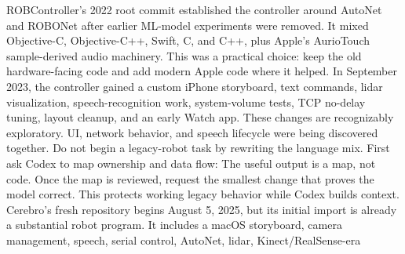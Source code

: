 {}
\markdownRendererSectionEnd \markdownRendererSectionBegin
{}\markdownRendererInterblockSeparator
{}ROBController's 2022 root commit established the controller around AutoNet and\markdownRendererSoftLineBreak
{}ROBONet after earlier ML-model experiments were removed. It mixed Objective-C,\markdownRendererSoftLineBreak
{}Objective-C++, Swift, C, and C++, plus Apple's AurioTouch sample-derived audio\markdownRendererSoftLineBreak
{}machinery. This was a practical choice: keep the old hardware-facing code and\markdownRendererSoftLineBreak
{}add modern Apple code where it helped.\markdownRendererParagraphSeparator
{}In September 2023, the controller gained a custom iPhone storyboard, text\markdownRendererSoftLineBreak
{}commands, lidar visualization, speech-recognition work, system-volume tests,\markdownRendererSoftLineBreak
{}TCP no-delay tuning, layout cleanup, and an early Watch app. These changes are\markdownRendererSoftLineBreak
{}recognizably exploratory. UI, network behavior, and speech lifecycle were\markdownRendererSoftLineBreak
{}being discovered together.\markdownRendererInterblockSeparator
{}\markdownRendererSectionBegin
{}\markdownRendererInterblockSeparator
{}Do not begin a legacy-robot task by rewriting the language mix. First ask Codex\markdownRendererSoftLineBreak
{}to map ownership and data flow:\markdownRendererInterblockSeparator
{}\markdownRendererInterblockSeparator
{}The useful output is a map, not code. Once the map is reviewed, request the\markdownRendererSoftLineBreak
{}smallest change that proves the model correct. This protects working legacy\markdownRendererSoftLineBreak
{}behavior while Codex builds context.\markdownRendererInterblockSeparator
{}\markdownRendererThematicBreak{}\markdownRendererInterblockSeparator
{}
\markdownRendererSectionEnd 
\markdownRendererSectionEnd \markdownRendererSectionBegin
{}\markdownRendererInterblockSeparator
{}Cerebro's fresh repository begins August 5, 2025, but its initial import is\markdownRendererSoftLineBreak
{}already a substantial robot program. It includes a macOS storyboard, camera\markdownRendererSoftLineBreak
{}management, speech, serial control, AutoNet, lidar, Kinect/RealSense-era\markdownRendererSoftLineBreak
